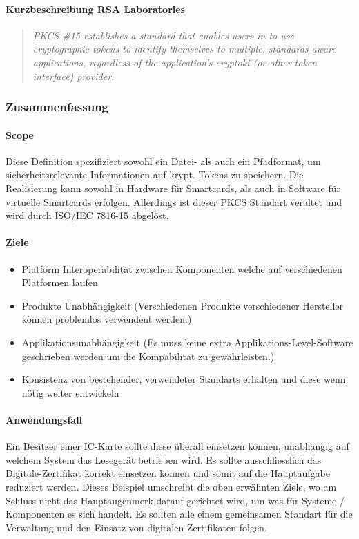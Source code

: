 \documentclass[10pt,a4paper]{article}
\begin{document}
\paragraph{Kurzbeschreibung RSA Laboratories}

\begin{quotation}
    \itshape PKCS \#15 establishes a standard that enables users in to use cryptographic
    tokens to identify themselves to multiple, standards-aware applications, regardless of
    the application's cryptoki (or other token interface) provider.
\end{quotation}

\subsubsection{Zusammenfassung}

\paragraph{Scope}
Diese Definition spezifiziert sowohl ein Datei- als auch ein Pfadformat, um
sicherheitsrelevante Informationen auf krypt. Tokens zu speichern. Die Realisierung kann
sowohl in Hardware für Smartcards, als auch in Software für virtuelle Smartcards erfolgen.
Allerdings ist dieser PKCS Standart veraltet und wird durch ISO/IEC 7816-15 abgelöst.

\paragraph{Ziele}
\begin{itemize}
    \item Platform Interoperabilität zwischen Komponenten welche auf verschiedenen
        Platformen laufen
    \item Produkte Unabhängigkeit (Verschiedenen Produkte verschiedener Hersteller können
        problemlos verwendent werden.)
    \item Applikationsunabhängigkeit (Es muss keine extra Applikations-Level-Software
        geschrieben werden um die Kompabilität zu gewährleisten.)
    \item Konsistenz von bestehender, verwendeter Standarts erhalten und diese wenn nötig
        weiter entwickeln
\end{itemize}

\paragraph{Anwendungsfall}
Ein Besitzer einer IC-Karte sollte diese überall einsetzen können, unabhängig auf welchem
System das Lesegerät betrieben wird. Es sollte ausschliesslich das Digitale-Zertifikat
korrekt einsetzen können und somit auf die Hauptaufgabe reduziert werden. Dieses Beispiel
umschreibt die oben erwähnten Ziele, wo am Schluss nicht das Hauptaugenmerk darauf
gerichtet wird, um was für Systeme / Komponenten es sich handelt. Es sollten alle einem
gemeinsamen Standart für die Verwaltung und den Einsatz von digitalen Zertifikaten folgen.
\end{document}
